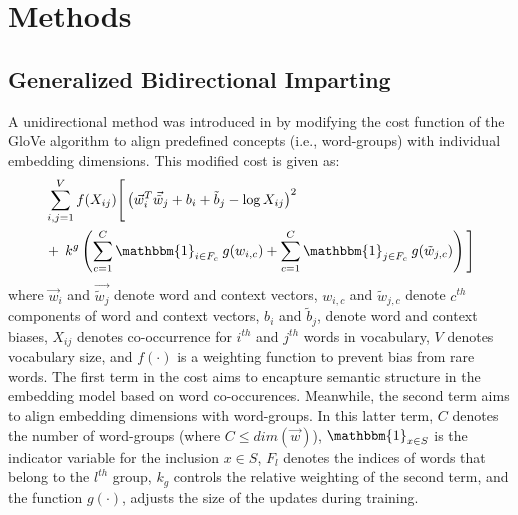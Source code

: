 \documentclass[11pt,a4paper]{article}
\newcommand{\indicator}{\ensuremath{\mathbbm{1}}}
\begin{document}
\section{Methods} \label{sec:methods}


\subsection{Generalized Bidirectional Imparting }
\label{sec:gen_imparting}

A unidirectional method was introduced in \citep{senel20impart} by modifying the cost function of the GloVe algorithm to align predefined concepts (i.e., word-groups) with individual embedding dimensions. This modified cost is given as:
\begin{align}
\begin{split}
	 &\sum_{i,j=1}^{V} f(X_{ij}) \Bigg[ \left(\vec{w}_i^T\vec{\tilde{w}}_j + b_i + \tilde{b}_j -\log{}X_{ij}\right)^2 \\
	      & +\: k^g\left(\sum_{c=1}^{C} \indicator_{i\in{}F_c} \: g(w_{i,c}) + \sum_{c=1}^{C} \indicator_{j \in F_c} \: g(\tilde{w}_{j,c})  \right) \Bigg] 
\end{split}
\label{eq:glove_uni}
\end{align}
where $\vec{w}_i$ and $\vec{\tilde{w}_j}$ denote word and context vectors, $w_{i,c}$ and $\tilde{w}_{j,c}$ denote $c^{th}$ components of word and context vectors, $b_i$ and $\tilde{b}_j$, denote word and context biases, $X_{ij}$ denotes co-occurrence for $i^{th}$ and $j^{th}$ words in vocabulary, $V$ denotes vocabulary size, and $f(\cdot)$ is a weighting function to prevent bias from rare words. The first term in the cost aims to encapture semantic structure in the embedding model based on word co-occurences. Meanwhile, the second term aims to align embedding dimensions with word-groups. In this latter term, $C$ denotes the number of word-groups (where $C\leq dim(\vec{w})$), $\indicator_{x \in S}$ is the indicator variable for the inclusion ${x \in S}$, $F_l$ denotes the indices of words that belong to the $l^{th}$ group, $k_g$ controls the relative weighting of the second term, and the function $g(\cdot)$, adjusts the size of the updates during training. 
\end{document}
